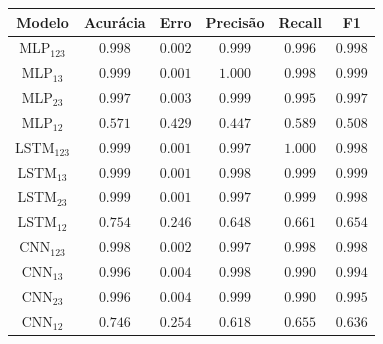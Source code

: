 \documentclass[a4paper,fleqn]{cas-sc}
\begin{document}
\begin{minipage}{0.45\textwidth}
	\begingroup
	\begin{tiny}	
		\setlength{\tabcolsep}{3pt}
		\renewcommand{\arraystretch}{1.15}
		
		
		\begin{tabular*}{\textwidth}{@{} CCCCCC@{} }
			\toprule
			Modelo&Acurácia&Erro&Precisão&Recall&F1 \\
			\midrule
				MLP$_{123}$ & $0.998$ & $0.002$ & $0.999$ & $0.996$ & $0.998$ \\
				MLP$_{13}$ & $0.999$ & $0.001$ & $1.000$ & $0.998$ & $0.999$ \\
				MLP$_{23}$ & $0.997$ & $0.003$ & $0.999$ & $0.995$ & $0.997$ \\
				MLP$_{12}$ & $0.571$ & $0.429$ & $0.447$ & $0.589$ & $0.508$ \\
				LSTM$_{123}$ & $0.999$ & $0.001$ & $0.997$ & $1.000$ & $0.998$ \\
				LSTM$_{13}$ & $0.999$ & $0.001$ & $0.998$ & $0.999$ & $0.999$ \\
				LSTM$_{23}$ & $0.999$ & $0.001$ & $0.997$ & $0.999$ & $0.998$ \\
				LSTM$_{12}$ & $0.754$ & $0.246$ & $0.648$ & $0.661$ & $0.654$ \\
				CNN$_{123}$ & $0.998$ & $0.002$ & $0.997$ & $0.998$ & $0.998$ \\
				CNN$_{13}$ & $0.996$ & $0.004$ & $0.998$ & $0.990$ & $0.994$ \\
				CNN$_{23}$ & $0.996$ & $0.004$ & $0.999$ & $0.990$ & $0.995$ \\
				CNN$_{12}$ & $0.746$ & $0.254$ & $0.618$ & $0.655$ & $0.636$ \\    		
			\bottomrule
		\end{tabular*}
		\vspace{-0.3cm}
		\label{tab:metricas_100Mbps_teste}
	\end{tiny}
	\endgroup
\end{minipage}
\end{document}
